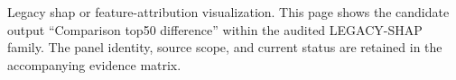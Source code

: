 Legacy shap or feature-attribution visualization. This page shows the candidate output ``Comparison top50 difference'' within the audited LEGACY-SHAP family. The panel identity, source scope, and current status are retained in the accompanying evidence matrix.
